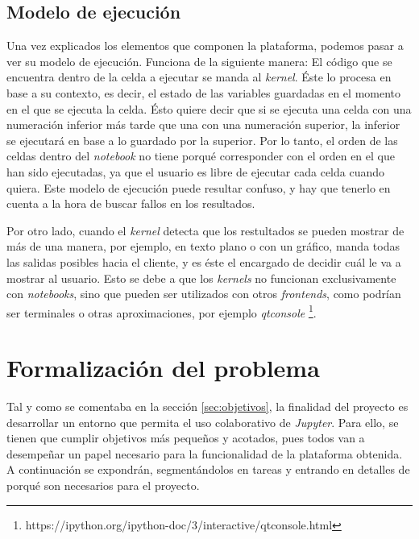 \documentclass[11pt,spanish,listoffigures]{tfgetsinf}
\begin{document}
\subsection{Modelo de ejecución}
\label{subsec:modelo-ejec}

Una vez explicados los elementos que componen la plataforma, podemos pasar a ver su modelo de ejecución. Funciona de la siguiente manera: El código que se encuentra dentro de la celda a ejecutar se manda al \textit{kernel}. Éste lo procesa en base a su contexto, es decir, el estado de las variables guardadas en el momento en el que se ejecuta la celda. Ésto quiere decir que si se ejecuta una celda con una numeración inferior más tarde que una con una numeración superior, la inferior se ejecutará en base a lo guardado por la superior. Por lo tanto, el orden de las celdas dentro del \textit{notebook} no tiene porqué corresponder con el orden en el que han sido ejecutadas, ya que el usuario es libre de ejecutar cada celda cuando quiera. Este modelo de ejecución puede resultar confuso, y hay que tenerlo en cuenta a la hora de buscar fallos en los resultados.

Por otro lado, cuando el \textit{kernel} detecta que los restultados se pueden mostrar de más de una manera, por ejemplo, en texto plano o con un gráfico, manda todas las salidas posibles hacia el cliente, y es éste el encargado de decidir cuál le va a mostrar al usuario. Esto se debe a que los \textit{kernels} no funcionan exclusivamente con \textit{notebooks}, sino que pueden ser utilizados con otros \textit{frontends}, como podrían ser terminales o otras aproximaciones, por ejemplo \textit{qtconsole} \footnote{https://ipython.org/ipython-doc/3/interactive/qtconsole.html}.



\section{Formalización del problema}
\label{sec:formalizacion}

Tal y como se comentaba en la sección \ref{sec:objetivos}, la finalidad del proyecto es desarrollar un entorno que permita el uso colaborativo de \textit{Jupyter}. Para ello, se tienen que cumplir objetivos más pequeños y acotados, pues todos van a desempeñar un papel necesario para la funcionalidad de la plataforma obtenida. A continuación se expondrán, segmentándolos en tareas y entrando en detalles de porqué son necesarios para el proyecto.
\end{document}
